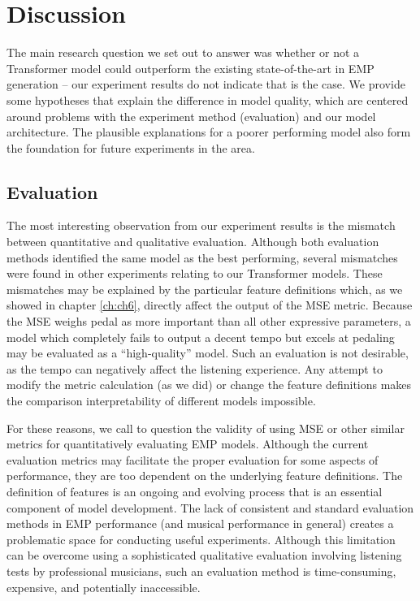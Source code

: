 \chapter{Discussion} \label{ch:ch7}
The main research question we set out to answer was whether or not a Transformer model could outperform the existing state-of-the-art in EMP generation -- our experiment results do not indicate that is the case. We provide some hypotheses that explain the difference in model quality, which are centered around problems with the experiment method (evaluation) and our model architecture. The plausible explanations for a poorer performing model also form the foundation for future experiments in the area.

\section{Evaluation}
The most interesting observation from our experiment results is the mismatch between quantitative and qualitative evaluation. Although both evaluation methods identified the same model as the best performing, several mismatches were found in other experiments relating to our Transformer models. These mismatches may be explained by the particular \vnetf{} feature definitions which, as we showed in chapter \ref{ch:ch6}, directly affect the output of the MSE metric. Because the \vnetf{} MSE weighs pedal as more important than all other expressive parameters, a model which completely fails to output a decent tempo but excels at pedaling may be evaluated as a ``high-quality'' model. Such an evaluation is not desirable, as the tempo can negatively affect the listening experience. Any attempt to modify the metric calculation (as we did) or change the feature definitions makes the comparison interpretability of different models impossible. 

For these reasons, we call to question the validity of using MSE or other similar metrics for quantitatively evaluating EMP models. Although the current evaluation metrics may facilitate the proper evaluation for some aspects of performance, they are too dependent on the underlying feature definitions. The definition of features is an ongoing and evolving process that is an essential component of model development. The lack of consistent and standard evaluation methods in EMP performance (and musical performance in general) creates a problematic space for conducting useful experiments. Although this limitation can be overcome using a sophisticated qualitative evaluation involving listening tests by professional musicians, such an evaluation method is time-consuming, expensive, and potentially inaccessible. 

